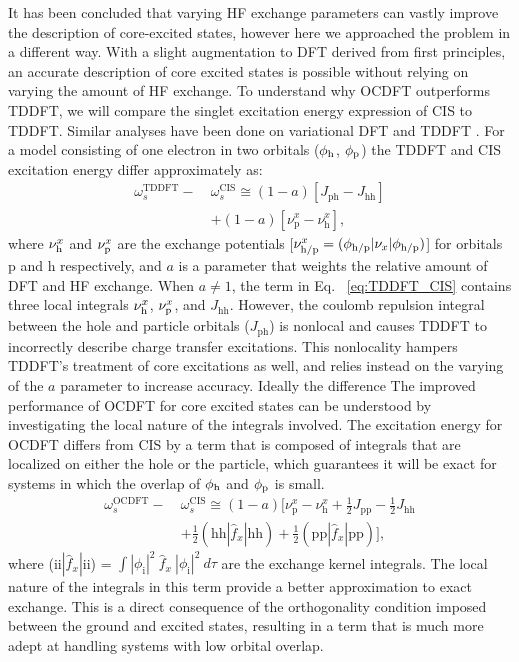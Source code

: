 \documentclass[12pt]{article}
\begin{document}
It has been concluded that varying HF exchange parameters can vastly improve the description of core-excited states,\cite{nakata_time-dependent_2006} however here we approached the problem in a different way. With a slight augmentation to DFT derived from first principles, an accurate description of core excited states is possible without relying on varying the amount of HF exchange. To understand why OCDFT outperforms TDDFT, we will compare the singlet excitation energy expression of CIS to TDDFT. Similar analyses have been done on variational DFT \cite{ziegler_implementation_2012} and TDDFT \cite{casida_charge-transfer_2000}. For a model consisting of one electron in two orbitals ($\phi_{\rm h}$, $\phi_{\rm p}$) the TDDFT and CIS excitation energy differ approximately as:
\begin{align}
\label{eq:TDDFT_CIS}
 \nonumber \omega^{\text{TDDFT}}_s - \ &\omega^{\text{CIS}}_s \cong (1 - a) [J_{\text{ph}} - J_{\text{hh}}] \\ &+ (1 - a) [\nu_{\text{p}}^x - \nu_{\text{h}}^x] ,
\end{align}
where $\nu_{\rm h}^x$ and $\nu_{\rm p}^x$ are the exchange potentials [$\nu_{\rm h/p}^x = (\phi_{\rm h/p}|\nu_x|\phi_{\rm h/p})$] for orbitals p and h respectively, and $a$ is a parameter that weights the relative amount of DFT and HF exchange. When $a \neq 1$, the term in Eq. ~\ref{eq:TDDFT_CIS} contains three local integrals $\nu_{\rm h}^x$, $\nu_{\rm p}^x$, and $J_{\text{hh}}$. However, the coulomb repulsion integral between the hole and particle orbitals ($J_{\text{ph}}$) is nonlocal and causes TDDFT to incorrectly describe charge transfer excitations. This nonlocality hampers TDDFT's treatment of core excitations as well, and relies instead on the varying of the $a$ parameter to increase accuracy. Ideally the difference  The improved performance of OCDFT for core excited states can be understood by investigating the local nature of the integrals involved. The excitation energy for OCDFT differs from CIS by a term that is composed of integrals that are localized on either the hole or the particle, which guarantees it will be exact for systems in which the overlap of $\phi_{\rm h}$ and $\phi_{\rm p}$ is small.
\begin{align}
\nonumber \omega^{\text{OCDFT}}_s - \ &\omega^{\text{CIS}}_s  \cong (1 - a) [\nu_{\text{p}}^x - \nu_{\text{h}}^x + \frac{1}{2} J_{\text{pp}} - \frac{1}{2} J_{\text{hh}} \\
&+ \frac{1}{2} (\text{hh}|\hat{f}_x|\text{hh}) +\frac{1}{2} (\text{pp}|\hat{f}_x|\text{pp})] ,
\end{align}
where (ii$|\hat{f}_x|$ii) = $\int |\phi_{\text{i}}|^2\ \hat{f}_x\  |\phi_{\text{i}}|^2 \ d\tau$ are the exchange kernel integrals. The local nature of the integrals in this term provide a better approximation to exact exchange. This is a direct consequence of the orthogonality condition imposed between the ground and excited states, resulting in a term that is much more adept at handling systems with low orbital overlap.
\end{document}
